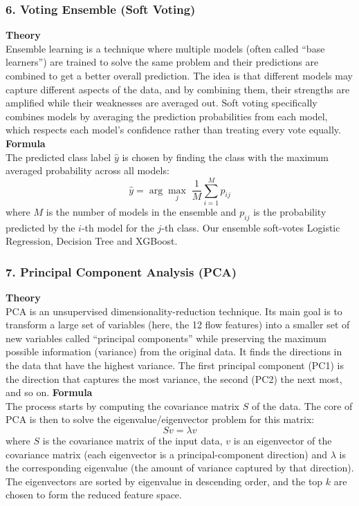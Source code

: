\documentclass[12pt,a4paper]{article}
\begin{document}
\subsubsection*{6. Voting Ensemble (Soft Voting)}
\textbf{Theory}\\
Ensemble learning is a technique where multiple models (often called ``base
learners'') are trained to solve the same problem and their predictions are combined
to get a better overall prediction. The idea is that different models may capture
different aspects of the data, and by combining them, their strengths are amplified
while their weaknesses are averaged out. Soft voting specifically combines models by
averaging the prediction probabilities from each model, which respects each model's
confidence rather than treating every vote equally.
\textbf{Formula}\\
The predicted class label $\hat{y}$ is chosen by finding the class with the maximum
averaged probability across all models:
\begin{equation}
  \hat{y} = \arg\max_{j} \; \frac{1}{M} \sum_{i=1}^{M} p_{ij}
\end{equation}
where $M$ is the number of models in the ensemble and $p_{ij}$ is the probability
predicted by the $i$-th model for the $j$-th class. Our ensemble soft-votes Logistic
Regression, Decision Tree and XGBoost.

\subsubsection*{7. Principal Component Analysis (PCA)}
\textbf{Theory}\\
PCA is an unsupervised dimensionality-reduction technique. Its main goal is to
transform a large set of variables (here, the 12 flow features) into a smaller set of
new variables called ``principal components'' while preserving the maximum possible
information (variance) from the original data. It finds the directions in the data
that have the highest variance. The first principal component (PC1) is the direction
that captures the most variance, the second (PC2) the next most, and so on.
\textbf{Formula}\\
The process starts by computing the covariance matrix $S$ of the data. The core of
PCA is then to solve the eigenvalue/eigenvector problem for this matrix:
\begin{equation}
  S v = \lambda v
\end{equation}
where $S$ is the covariance matrix of the input data, $v$ is an eigenvector of the
covariance matrix (each eigenvector is a principal-component direction) and $\lambda$
is the corresponding eigenvalue (the amount of variance captured by that direction).
The eigenvectors are sorted by eigenvalue in descending order, and the top $k$ are
chosen to form the reduced feature space.
\end{document}
